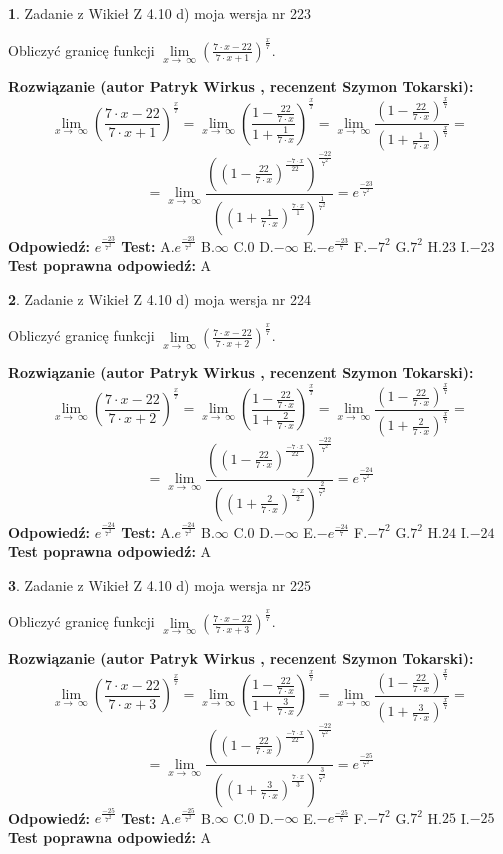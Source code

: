 \documentclass[12pt, a4paper]{article}
\theoremstyle{definition} %
\newtheorem{zad}{}
\newcommand{\zadStart}[1]{\begin{zad}#1\newline}
\newcommand{\zadStop}{\end{zad}}
\newcommand{\rozwStart}[2]{\noindent \textbf{Rozwiązanie (autor #1 , recenzent #2): }\newline}
\newcommand{\rozwStop}{\newline}
\newcommand{\odpStart}{\noindent \textbf{Odpowiedź:}\newline}
\newcommand{\odpStop}{\newline}
\newcommand{\testStart}{\noindent \textbf{Test:}\newline}
\newcommand{\testStop}{\newline}
\newcommand{\kluczStart}{\noindent \textbf{Test poprawna odpowiedź:}\newline}
\newcommand{\kluczStop}{\newline}
\begin{document}
\zadStart{Zadanie z Wikieł Z 4.10 d) moja wersja nr 223}


Obliczyć granicę funkcji  $\lim\limits_{x\to\ \infty}(\frac{7\cdot x-22}{7\cdot x+1})^{\frac{x}{7}}$.
\zadStop
\rozwStart{Patryk Wirkus}{Szymon Tokarski}
$$\lim\limits_{x\to\ \infty}(\frac{7\cdot x-22}{7\cdot x+1})^{\frac{x}{7}} = \lim\limits_{x\to\ \infty}(\frac{1-\frac{22}{7\cdot x}}{1+\frac{1}{7\cdot x}})^{\frac{x}{7}}=\lim\limits_{x\to\ \infty}\frac{(1-\frac{22}{7\cdot x})^{\frac{x}{7}}}{(1+\frac{1}{7\cdot x})^{\frac{x}{7}}}=$$
$$=\lim\limits_{x\to\ \infty}\frac{((1-\frac{22}{7\cdot x})^{\frac{-7\cdot x}{22}})^{\frac{-22}{7^{2}}}}{((1+\frac{1}{7\cdot x})^{\frac{7\cdot x}{1}})^{\frac{1}{7^{2}}}}=e^{\frac{-23}{7^{2}}}$$
\rozwStop
\odpStart
$e^{\frac{-23}{7^{2}}}$
\odpStop
\testStart
A.$e^{\frac{-23}{7^{2}}}$ B.$\infty$ C.$0$ D.$-\infty$ E.$-e^{\frac{-23}{7}}$
F.$-7^{2}$ G.$7^{2}$
H.$23$
I.$-23$
\testStop
\kluczStart
A
\kluczStop



\zadStart{Zadanie z Wikieł Z 4.10 d) moja wersja nr 224}


Obliczyć granicę funkcji  $\lim\limits_{x\to\ \infty}(\frac{7\cdot x-22}{7\cdot x+2})^{\frac{x}{7}}$.
\zadStop
\rozwStart{Patryk Wirkus}{Szymon Tokarski}
$$\lim\limits_{x\to\ \infty}(\frac{7\cdot x-22}{7\cdot x+2})^{\frac{x}{7}} = \lim\limits_{x\to\ \infty}(\frac{1-\frac{22}{7\cdot x}}{1+\frac{2}{7\cdot x}})^{\frac{x}{7}}=\lim\limits_{x\to\ \infty}\frac{(1-\frac{22}{7\cdot x})^{\frac{x}{7}}}{(1+\frac{2}{7\cdot x})^{\frac{x}{7}}}=$$
$$=\lim\limits_{x\to\ \infty}\frac{((1-\frac{22}{7\cdot x})^{\frac{-7\cdot x}{22}})^{\frac{-22}{7^{2}}}}{((1+\frac{2}{7\cdot x})^{\frac{7\cdot x}{2}})^{\frac{2}{7^{2}}}}=e^{\frac{-24}{7^{2}}}$$
\rozwStop
\odpStart
$e^{\frac{-24}{7^{2}}}$
\odpStop
\testStart
A.$e^{\frac{-24}{7^{2}}}$ B.$\infty$ C.$0$ D.$-\infty$ E.$-e^{\frac{-24}{7}}$
F.$-7^{2}$ G.$7^{2}$
H.$24$
I.$-24$
\testStop
\kluczStart
A
\kluczStop



\zadStart{Zadanie z Wikieł Z 4.10 d) moja wersja nr 225}


Obliczyć granicę funkcji  $\lim\limits_{x\to\ \infty}(\frac{7\cdot x-22}{7\cdot x+3})^{\frac{x}{7}}$.
\zadStop
\rozwStart{Patryk Wirkus}{Szymon Tokarski}
$$\lim\limits_{x\to\ \infty}(\frac{7\cdot x-22}{7\cdot x+3})^{\frac{x}{7}} = \lim\limits_{x\to\ \infty}(\frac{1-\frac{22}{7\cdot x}}{1+\frac{3}{7\cdot x}})^{\frac{x}{7}}=\lim\limits_{x\to\ \infty}\frac{(1-\frac{22}{7\cdot x})^{\frac{x}{7}}}{(1+\frac{3}{7\cdot x})^{\frac{x}{7}}}=$$
$$=\lim\limits_{x\to\ \infty}\frac{((1-\frac{22}{7\cdot x})^{\frac{-7\cdot x}{22}})^{\frac{-22}{7^{2}}}}{((1+\frac{3}{7\cdot x})^{\frac{7\cdot x}{3}})^{\frac{3}{7^{2}}}}=e^{\frac{-25}{7^{2}}}$$
\rozwStop
\odpStart
$e^{\frac{-25}{7^{2}}}$
\odpStop
\testStart
A.$e^{\frac{-25}{7^{2}}}$ B.$\infty$ C.$0$ D.$-\infty$ E.$-e^{\frac{-25}{7}}$
F.$-7^{2}$ G.$7^{2}$
H.$25$
I.$-25$
\testStop
\kluczStart
A
\kluczStop
\end{document}
